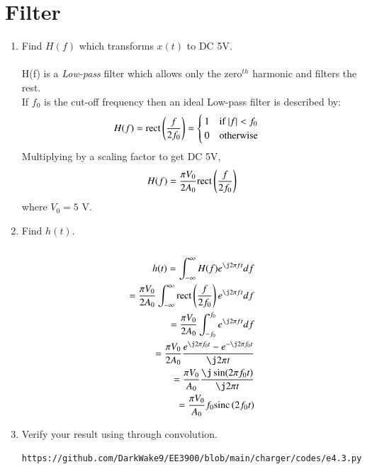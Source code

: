 \documentclass[journal,12pt,twocolumn]{IEEEtran}
\renewcommand\thesection{\arabic{section}}
\begin{document}
\section{Filter}
\begin{enumerate}[label=\thesection.\arabic*
,ref=\thesection.\theenumi]
\item Find $H(f)$ which transforms $x(t)$ to DC 5V.\\
\solution\\
H(f) is a \textit{Low-pass} filter which allows only the zero$^{th}$ harmonic and filters the rest.\\

If $f_0$ is the cut-off frequency then an ideal Low-pass filter is described by:
\begin{align}
	H(f) = \rect{\frac{f}{2f_0}} = \begin{cases}
		1 \quad $if $ \abs{f} < f_0\\
		0 \quad $otherwise$
	\end{cases}
\end{align}
Multiplying by a scaling factor to get DC 5V,
\begin{align}
	H(f) = \frac{\pi V_0}{2A_0}\text{rect}\left(\frac{f}{2f_0}\right)
\end{align}
where $V_0 = 5$ V.
\item Find $h(t)$.\\
\solution\\
\begin{align}
	h(t) = \int_{-\infty}^{\infty} H(f)e^{\j2\pi f t}df\\
	= \frac{\pi V_0}{2A_0} \int_{-\infty}^{\infty}\rect{\frac{f}{2f_0}} e^{\j2\pi f t}df\\
	= \frac{\pi V_0}{2A_0} \int_{-f_0}^{f_0} e^{\j2\pi f t}df\\
	= \frac{\pi V_0}{2A_0} \dfrac{e^{\j2\pi f_0 t} - e^{-\j2\pi f_0 t}}{\j2\pi t}\\
	= \frac{\pi V_0}{A_0} \dfrac{\j\sin(2\pi f_0 t)}{\j2\pi t}\\
	= \frac{\pi V_0}{A_0} f_0\sinc{2f_0 t}
\end{align}
\item Verify your result using  through convolution.
\solution
\begin{lstlisting}
https://github.com/DarkWake9/EE3900/blob/main/charger/codes/e4.3.py
\end{lstlisting}
\begin{figure}[!ht]
	\begin{center}

\end{center}
\end{figure}
\end{enumerate}
\end{document}
